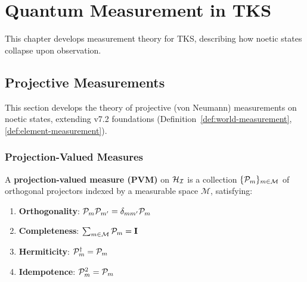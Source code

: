\chapter{Quantum Measurement in TKS}
\label{ch:quantum-measurement}

\begin{tcolorbox}[colback=blue!5!white,colframe=blue!75!black,title=\vnewthree]
This chapter develops measurement theory for TKS, describing how noetic states collapse upon observation.
\end{tcolorbox}

\section{Projective Measurements}
\label{sec:projective-measurements}

This section develops the theory of projective (von Neumann) measurements on noetic states, extending v7.2 foundations (Definition~\ref{def:world-measurement}, \ref{def:element-measurement}).

\subsection{Projection-Valued Measures}

\begin{definition}
\label{def:pvm}
A \textbf{projection-valued measure (PVM)} on $\mathcal{H}_{\mathcal{I}}$ is a collection $\{\mathcal{P}_m\}_{m \in \mathcal{M}}$ of orthogonal projectors indexed by a measurable space $\mathcal{M}$, satisfying:
\begin{enumerate}
  \item \textbf{Orthogonality}: $\mathcal{P}_m \mathcal{P}_{m'} = \delta_{mm'} \mathcal{P}_m$
  \item \textbf{Completeness}: $\sum_{m \in \mathcal{M}} \mathcal{P}_m = \mathbf{I}$
  \item \textbf{Hermiticity}: $\mathcal{P}_m^\dagger = \mathcal{P}_m$
  \item \textbf{Idempotence}: $\mathcal{P}_m^2 = \mathcal{P}_m$
\end{enumerate}
\end{definition}

